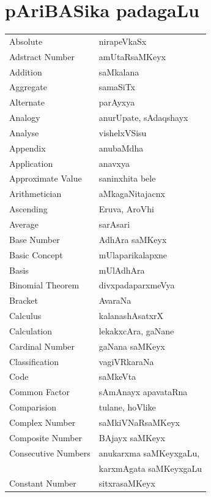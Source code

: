 \eject
\section*{\hspace{3.5cm}pAriBASika padagaLu}


\begin{longtable}{>{\rm}l@{\hspace{1.25cm}}l}
Absolute & nirapeVkaSx\\
Adstract Number & amUtaRsaMKeyx\\
Addition & saMkalana\\
Aggregate & samaSiTx\\
Alternate & parAyxya\\
Analogy & anurUpate, sAdaqshayx\\
Analyse & vishelxVSisu\\
Appendix & anubaMdha\\
Application & anavxya \\
Approximate Value & saninxhita bele\\
Arithmetician & aMkagaNitajacnx\\
Ascending & Eruva, AroVhi\\
Average & sarAsari \\
Base Number & AdhAra saMKeyx\\
Basic Concept & mUlaparikalapxne\\
Basis & mUlAdhAra \\
Binomial Theorem & divxpadaparxmeVya\\
Bracket & AvaraNa\\
Calculus & kalanashAsatxrX\\
Calculation & lekakxcAra, gaNane\\
Cardinal Number & gaNana saMKeyx\\
Classification & vagiVRkaraNa\\
Code & saMkeVta\\
Common Factor & sAmAnayx apavataRna\\
Comparision & tulane, hoVlike\\
Complex Number & saMkiVNaRsaMKeyx\\
Composite Number & BAjayx saMKeyx\\
Consecutive Numbers & anukarxma saMKeyxgaLu,\\
                    & karxmAgata saMKeyxgaLu\\
Constant Number & sitxrasaMKeyx\\

\end{longtable}
